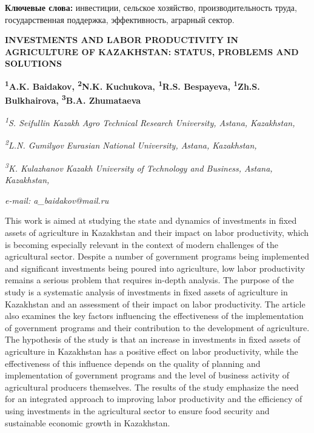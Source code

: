 {\bfseries Ключевые слова:} инвестиции, сельское хозяйство,
производительность труда, государственная поддержка, эффективность,
аграрный сектор.

\begin{articleheader}
{\bfseries INVESTMENTS AND LABOR PRODUCTIVITY IN AGRICULTURE OF KAZAKHSTAN:
STATUS, PROBLEMS AND SOLUTIONS}

{\bfseries \textsuperscript{1}A.K. Baidakov\textsuperscript{\envelope },
\textsuperscript{2}N.K. Kuchukova,
\textsuperscript{1}R.S. Bespayeva,
\textsuperscript{1}Zh.S. Bulkhairova,
\textsuperscript{3}B.A. Zhumataeva}
\end{articleheader}

\begin{affiliation}
\emph{\textsuperscript{1}S. Seifullin Kazakh Agro Technical Research
University, Astana, Kazakhstan,}

\emph{\textsuperscript{2}L.N. Gumilyov Eurasian National University,
Astana, Kazakhstan,}

\emph{\textsuperscript{3}K. Kulazhanov Kazakh University of Technology
and Business, Astana, Kazakhstan,}

\emph{e-mail: a\_baidakov@mail.ru}
\end{affiliation}

This work is aimed at studying the state and dynamics of investments in
fixed assets of agriculture in Kazakhstan and their impact on labor
productivity, which is becoming especially relevant in the context of
modern challenges of the agricultural sector. Despite a number of
government programs being implemented and significant investments being
poured into agriculture, low labor productivity remains a serious
problem that requires in-depth analysis. The purpose of the study is a
systematic analysis of investments in fixed assets of agriculture in
Kazakhstan and an assessment of their impact on labor productivity. The
article also examines the key factors influencing the effectiveness of
the implementation of government programs and their contribution to the
development of agriculture. The hypothesis of the study is that an
increase in investments in fixed assets of agriculture in Kazakhstan has
a positive effect on labor productivity, while the effectiveness of this
influence depends on the quality of planning and implementation of
government programs and the level of business activity of agricultural
producers themselves. The results of the study emphasize the need for an
integrated approach to improving labor productivity and the efficiency
of using investments in the agricultural sector to ensure food security
and sustainable economic growth in Kazakhstan.

